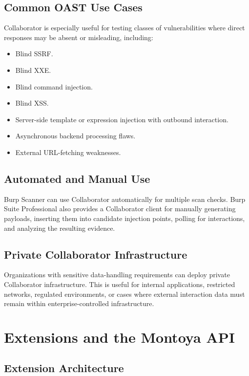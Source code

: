 \documentclass[11pt]{article}
\begin{document}
\subsection{Common OAST Use Cases}

Collaborator is especially useful for testing classes of vulnerabilities where direct responses may be absent or misleading, including:

\begin{itemize}
  \item Blind SSRF.
  \item Blind XXE.
  \item Blind command injection.
  \item Blind XSS.
  \item Server-side template or expression injection with outbound interaction.
  \item Asynchronous backend processing flaws.
  \item External URL-fetching weaknesses.
\end{itemize}

\subsection{Automated and Manual Use}

Burp Scanner can use Collaborator automatically for multiple scan checks. Burp Suite Professional also provides a Collaborator client for manually generating payloads, inserting them into candidate injection points, polling for interactions, and analyzing the resulting evidence.

\subsection{Private Collaborator Infrastructure}

Organizations with sensitive data-handling requirements can deploy private Collaborator infrastructure. This is useful for internal applications, restricted networks, regulated environments, or cases where external interaction data must remain within enterprise-controlled infrastructure.

\section{Extensions and the Montoya API}

\subsection{Extension Architecture}
\end{document}

